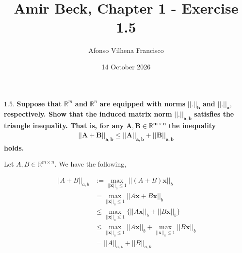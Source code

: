 \documentclass{article}
\title{Amir Beck, Chapter 1 - Exercise 1.5}
\author{Afonso Vilhena Francisco}
\date{14 October 2026}
\begin{document}
\maketitle

$\mathbf{1.5.}$ \textbf{Suppose that } $\mathbb{R}^m$ \textbf{and} $\mathbb{R}^n$ \textbf{are equipped with norms} $\mathbf{||.||_b}$ \textbf{and} $\mathbf{||.||_a},$ \textbf{respectively. Show that the induced matrix norm} $\mathbf{||.||_{a,b}}$ \textbf{satisfies the triangle inequality. That is, for any} $\mathbf{A,B \in \mathbb{R}^{m\times n}}$ \textbf{the inequality}
\begin{align*}
    \mathbf{||A+B||_{a,b} \leq ||A||_{a,b}+||B||_{a,b}}
\end{align*}
\textbf{holds.}

\vspace{0.3cm}

Let $A,B \in \mathbb{R}^{m \times n}$. We have the following,

\begin{align*}
    ||A+B||_{a,b} &:= \max_{||\mathbf{x||}_a \leq 1}||(A+B)\mathbf{x}||_b\\
    &=\max_{||\mathbf{x||}_a \leq 1}||A\mathbf{x}+B\mathbf{x}||_b\\
    & \leq \max_{||\mathbf{x||}_a \leq 1} \{ ||A\mathbf{x||}_b+||B\mathbf{x}||_b\} \\
    & \leq \max_{||\mathbf{x||}_a \leq 1} ||A\mathbf{x||}_b+\max_{||\mathbf{x||}_a \leq 1}||B\mathbf{x||}_b\\
    &= ||A||_{a,b}+||B||_{a,b}
\end{align*}
\end{document}

